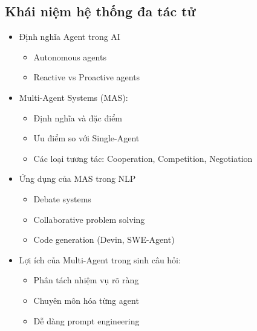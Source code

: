 \subsection{Khái niệm hệ thống đa tác tử}
\begin{itemize}
    \item Định nghĩa Agent trong AI
    \begin{itemize}
        \item Autonomous agents
        \item Reactive vs Proactive agents
    \end{itemize}
    \item Multi-Agent Systems (MAS):
    \begin{itemize}
        \item Định nghĩa và đặc điểm
        \item Ưu điểm so với Single-Agent
        \item Các loại tương tác: Cooperation, Competition, Negotiation
    \end{itemize}
    \item Ứng dụng của MAS trong NLP
    \begin{itemize}
        \item Debate systems
        \item Collaborative problem solving
        \item Code generation (Devin, SWE-Agent)
    \end{itemize}
    \item Lợi ích của Multi-Agent trong sinh câu hỏi:
    \begin{itemize}
        \item Phân tách nhiệm vụ rõ ràng
        \item Chuyên môn hóa từng agent
        \item Dễ dàng prompt engineering
    \end{itemize}
\end{itemize}

